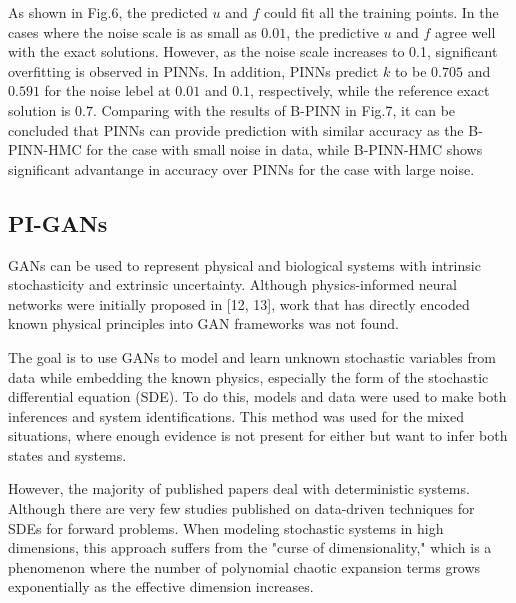 \documentclass[conference,compsoc]{IEEEtran}
\begin{document}
As shown in Fig.6, the predicted $u$ and $f$ could fit all the training points. In the cases where the noise scale is as small as $0.01$, the predictive $u$ and $f$ agree well with the exact solutions. However, as the noise scale increases to 0.1, significant overfitting is observed in PINNs\cite{raissi2019physics}. In addition, PINNs predict $k$ to be $0.705$ and $0.591$ for the noise lebel at $0.01$ and $0.1$, respectively, while the reference exact solution is $0.7$\cite{yang2021b}. Comparing with the results of B-PINN in Fig.7, it can be concluded that PINNs can provide prediction with similar accuracy as the B-PINN-HMC for the case with small noise in data, while B-PINN-HMC shows significant advantange in accuracy over  PINNs for the case with large noise\cite{yang2021b}.



\subsection{PI-GANs}

GANs can be used to represent physical and biological systems with intrinsic stochasticity and extrinsic uncertainty\cite{yang2018physics}\cite{cai2021physics}. Although physics-informed neural networks were initially proposed in [12, 13], work that has directly encoded known physical principles into GAN frameworks was not found\cite{yang2018physics}.

The goal is to use GANs to model and learn unknown stochastic variables from data while embedding the known physics, especially the form of the stochastic differential equation (SDE)\cite{yang2020generative}. To do this, models and data were used to make both inferences and system identifications\cite{yang2018physics}. This method was used for the mixed situations, where enough evidence is not present for either but want to infer both states and systems\cite{yang2018physics}.




However, the majority of published papers deal with deterministic systems. Although there are very few studies published on data-driven techniques for SDEs for forward problems. When modeling stochastic systems in high dimensions, this approach suffers from the "curse of dimensionality," which is a phenomenon where the number of polynomial chaotic expansion terms grows exponentially as the effective dimension increases.
\end{document}
